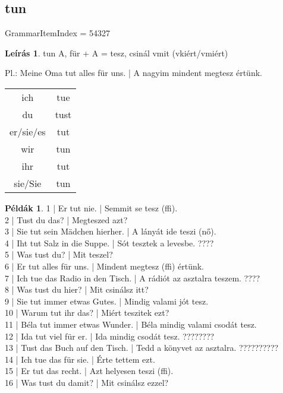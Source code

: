 \documentclass{article}
\theoremstyle{definition}
\newtheorem*{exmp}{Példák}
\newtheorem*{desc}{Leírás}
\begin{document}
\subsection{tun}

GrammarItemIndex = 54327

\begin{desc}
tun A, für + A = tesz, csinál vmit (vkiért/vmiért)

Pl.: Meine Oma tut alles für uns. | A nagyim mindent megtesz értünk.

\begin{tabular}{cc}
 ich & tue \\
 du & tust \\
 er/sie/es & tut \\
 wir & tun \\
 ihr & tut \\
 sie/Sie & tun \\
\end{tabular}
\end{desc}

\begin{exmp}
1 | Er tut nie. | Semmit se tesz (ffi).\\
2 | Tust du das? | Megteszed azt?\\
3 | Sie tut sein Mädchen hierher. | A lányát ide teszi (nő).\\
4 | Iht tut Salz in die Suppe. | Sót tesztek a levesbe. ????\\
5 | Was tust du? | Mit teszel?\\
6 | Er tut alles für uns. | Mindent megtesz (ffi) értünk.\\
7 | Ich tue das Radio in den Tisch. | A rádiót az asztalra teszem. ????\\
8 | Was tust du hier? | Mit csinálsz itt?\\
9 | Sie tut immer etwas Gutes. | Mindig valami jót tesz.\\
10 | Warum tut ihr das? | Miért teszitek ezt?\\
11 | Béla tut immer etwas Wunder. | Béla mindig valami csodát tesz.\\
12 | Ida tut viel für er. | Ida mindig csodát tesz. ????????\\
13 | Tust das Buch auf den Tisch. | Tedd a könyvet az asztalra. ??????????\\
14 | Ich tue das für sie. | Érte tettem ezt.\\
15 | Er tut das recht. | Azt helyesen teszi (ffi).\\
16 | Was tust du damit? | Mit csinálsz ezzel?\\
\end{exmp}
\end{document}

